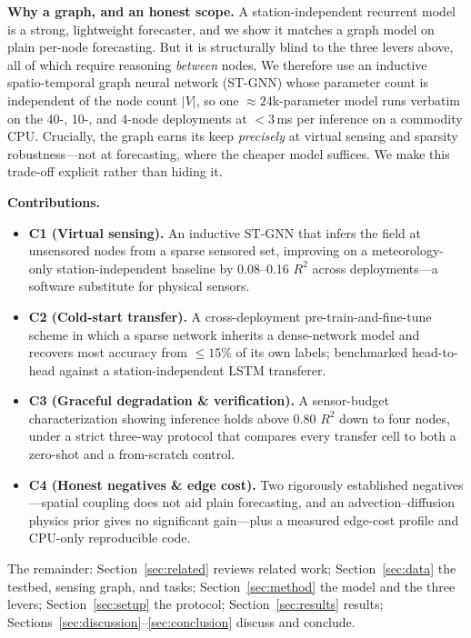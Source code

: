 \documentclass[journal]{IEEEtran}
\newcommand{\V}{\ensuremath{|V|}\xspace}
\newcommand{\Rtwo}{\ensuremath{R^{2}}\xspace}
\begin{document}
\textbf{Why a graph, and an honest scope.} A station-independent recurrent model is a strong, lightweight forecaster, and we show it matches a graph model on plain per-node forecasting. But it is structurally blind to the three levers above, all of which require reasoning \emph{between} nodes. We therefore use an inductive spatio-temporal graph neural network (ST-GNN) whose parameter count is independent of the node count \V, so one ${\approx}24$k-parameter model runs verbatim on the 40-, 10-, and 4-node deployments at ${<}3$\,ms per inference on a commodity CPU. Crucially, the graph earns its keep \emph{precisely} at virtual sensing and sparsity robustness---not at forecasting, where the cheaper model suffices. We make this trade-off explicit rather than hiding it.

\textbf{Contributions.}
\begin{itemize}
\item \textbf{C1 (Virtual sensing).} An inductive ST-GNN that infers the field at unsensored nodes from a sparse sensored set, improving on a meteorology-only station-independent baseline by 0.08--0.16 \Rtwo across deployments---a software substitute for physical sensors.
\item \textbf{C2 (Cold-start transfer).} A cross-deployment pre-train-and-fine-tune scheme in which a sparse network inherits a dense-network model and recovers most accuracy from ${\le}15\%$ of its own labels; benchmarked head-to-head against a station-independent LSTM transferer.
\item \textbf{C3 (Graceful degradation \& verification).} A sensor-budget characterization showing inference holds above 0.80 \Rtwo down to four nodes, under a strict three-way protocol that compares every transfer cell to both a zero-shot and a from-scratch control.
\item \textbf{C4 (Honest negatives \& edge cost).} Two rigorously established negatives---spatial coupling does not aid plain forecasting, and an advection--diffusion physics prior gives no significant gain---plus a measured edge-cost profile and CPU-only reproducible code.
\end{itemize}

The remainder: Section~\ref{sec:related} reviews related work; Section~\ref{sec:data} the testbed, sensing graph, and tasks; Section~\ref{sec:method} the model and the three levers; Section~\ref{sec:setup} the protocol; Section~\ref{sec:results} results; Sections~\ref{sec:discussion}--\ref{sec:conclusion} discuss and conclude.
\end{document}
